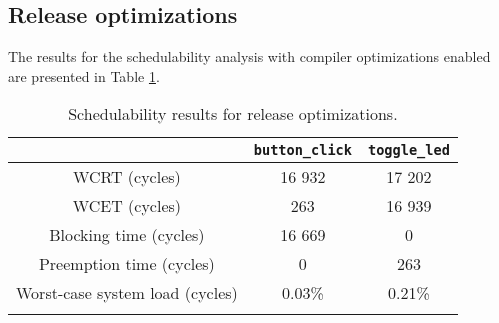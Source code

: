 \subsection{Release optimizations}
The results for the schedulability analysis with compiler
optimizations enabled are presented in Table \ref{tab:evalschedrelease}.
\begin{longtable}{|c | c | c|}
    \hline
     & \texttt{button\_click} & \texttt{toggle\_led} \\
    \hline
    WCRT (cycles) & 16 932 & 17 202 \\
    \hline
    WCET (cycles) & 263 & 16 939 \\
    \hline
    Blocking time (cycles) & 16 669 & 0 \\
    \hline
    Preemption time (cycles) & 0 & 263 \\
    \hline
    Worst-case system load (cycles) & 0.03\% & 0.21\% \\
    \hline
\caption{Schedulability results for release optimizations.}
\label{tab:evalschedrelease}
\end{longtable}
